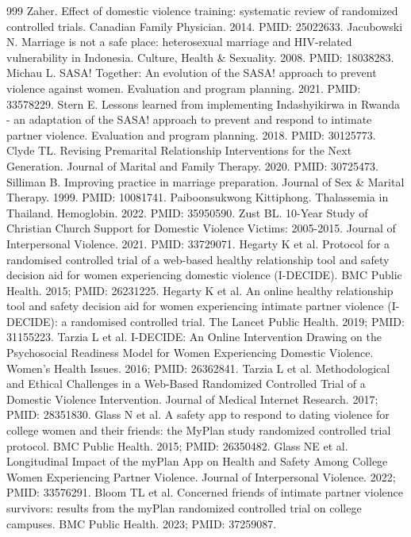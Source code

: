 \begin{thebibliography}{999}
 Zaher. Effect of domestic violence training: systematic review of randomized controlled trials. Canadian Family Physician. 2014. PMID: 25022633.
 Jacubowski N. Marriage is not a safe place: heterosexual marriage and HIV-related vulnerability in Indonesia. Culture, Health \& Sexuality. 2008. PMID: 18038283.
 Michau L. SASA! Together: An evolution of the SASA! approach to prevent violence against women. Evaluation and program planning. 2021. PMID: 33578229.
 Stern E. Lessons learned from implementing Indashyikirwa in Rwanda - an adaptation of the SASA! approach to prevent and respond to intimate partner violence. Evaluation and program planning. 2018. PMID: 30125773.
 Clyde TL. Revising Premarital Relationship Interventions for the Next Generation. Journal of Marital and Family Therapy. 2020. PMID: 30725473.
 Silliman B. Improving practice in marriage preparation. Journal of Sex \& Marital Therapy. 1999. PMID: 10081741.
 Paiboonsukwong Kittiphong. Thalassemia in Thailand. Hemoglobin. 2022. PMID: 35950590.
 Zust BL. 10-Year Study of Christian Church Support for Domestic Violence Victims: 2005-2015. Journal of Interpersonal Violence. 2021. PMID: 33729071.
 Hegarty K et al. Protocol for a randomised controlled trial of a web-based healthy relationship tool and safety decision aid for women experiencing domestic violence (I-DECIDE). BMC Public Health. 2015; PMID: 26231225.
 Hegarty K et al. An online healthy relationship tool and safety decision aid for women experiencing intimate partner violence (I-DECIDE): a randomised controlled trial. The Lancet Public Health. 2019; PMID: 31155223.
 Tarzia L et al. I-DECIDE: An Online Intervention Drawing on the Psychosocial Readiness Model for Women Experiencing Domestic Violence. Women's Health Issues. 2016; PMID: 26362841.
 Tarzia L et al. Methodological and Ethical Challenges in a Web-Based Randomized Controlled Trial of a Domestic Violence Intervention. Journal of Medical Internet Research. 2017; PMID: 28351830.
 Glass N et al. A safety app to respond to dating violence for college women and their friends: the MyPlan study randomized controlled trial protocol. BMC Public Health. 2015; PMID: 26350482.
 Glass NE et al. Longitudinal Impact of the myPlan App on Health and Safety Among College Women Experiencing Partner Violence. Journal of Interpersonal Violence. 2022; PMID: 33576291.
 Bloom TL et al. Concerned friends of intimate partner violence survivors: results from the myPlan randomized controlled trial on college campuses. BMC Public Health. 2023; PMID: 37259087.

\end{thebibliography}
